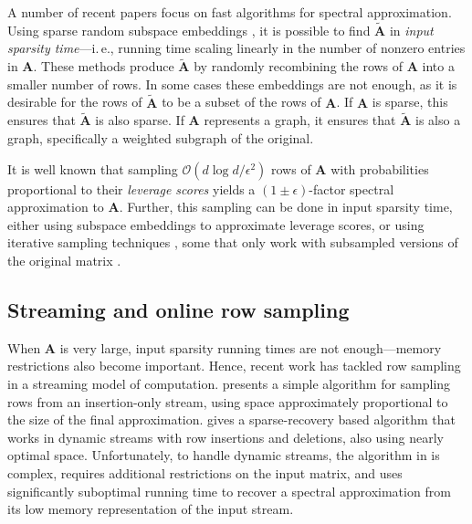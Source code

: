 \documentclass[11pt]{article}
\numberwithin{equation}{section}
\theoremstyle{definition}
\theoremstyle{plain}
\newcommand{\ie}{i.\,e.}
\newcommand{\Oh}{\ensuremath{\mathcal{O}}}
\newcommand{\bv}[1]{\mathbf{#1}}
\begin{document}
A number of recent papers focus on fast algorithms for spectral approximation. Using sparse random subspace embeddings \cite{Clarkson:2013,DBLP:conf/focs/NelsonN13,meng2013low}, it is possible to find $\bv{\tilde A}$ in \emph{input sparsity time}---\ie, running time scaling linearly in the number of nonzero entries in $\bv{A}$. These methods produce $\bv{\tilde A}$ by randomly recombining the rows of $\bv{A}$ into a smaller number of rows. In some cases these embeddings are not enough, as it is desirable for the rows of $\bv{\tilde A}$ to be a subset of the rows of $\bv{A}$. If $\bv{A}$ is sparse, this ensures that $\bv{\tilde A}$ is also sparse. If $\bv{A}$ represents a graph, it ensures that $\bv{\tilde A}$ is also a graph, specifically a weighted subgraph of the original.

It is well known that sampling $\Oh(d\log d/\epsilon^2)$ rows of $\bv{A}$ with probabilities proportional to their \emph{leverage scores} yields a $(1\pm \epsilon)$-factor spectral approximation to $\bv{A}$. Further, this sampling can be done in input sparsity time, either using subspace embeddings   to approximate leverage scores, or using iterative sampling techniques \cite{li2013iterative}, some that only work with subsampled versions of the original matrix \cite{cohen2015uniform}.

\subsection{Streaming and online row sampling}

When $\bv{A}$ is very large, input sparsity running times are not enough---memory restrictions also become important. Hence, recent work has tackled row sampling in a streaming model of computation. \cite{kelner2013spectral} presents a simple algorithm for sampling rows from an insertion-only stream, using space approximately proportional to the size of the final approximation. \cite{kapralov2014single} gives a sparse-recovery based algorithm that works in dynamic streams with row insertions and deletions, also using nearly optimal space. Unfortunately, to handle dynamic streams, the algorithm in \cite{kapralov2014single} is complex, requires additional restrictions on the input matrix, and uses significantly suboptimal running time to recover a spectral approximation from its low memory representation of the input stream.
\end{document}
